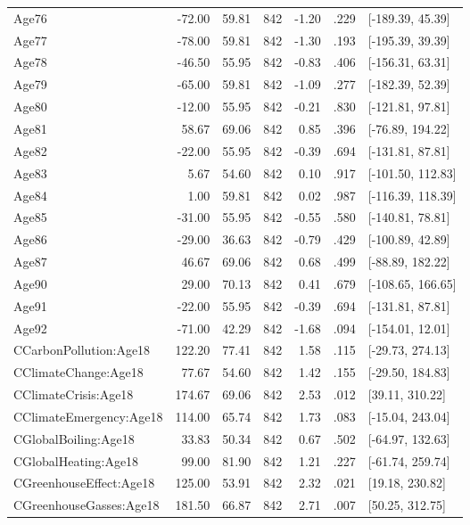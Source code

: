 \begin{table}[ht]
\begin{tabular}{lrrrrrl}
  Age76 & -72.00 & 59.81 & 842 & -1.20 & .229 & [-189.39, 45.39] \\ 
  Age77 & -78.00 & 59.81 & 842 & -1.30 & .193 & [-195.39, 39.39] \\ 
  Age78 & -46.50 & 55.95 & 842 & -0.83 & .406 & [-156.31, 63.31] \\ 
  Age79 & -65.00 & 59.81 & 842 & -1.09 & .277 & [-182.39, 52.39] \\ 
  Age80 & -12.00 & 55.95 & 842 & -0.21 & .830 & [-121.81, 97.81] \\ 
  Age81 & 58.67 & 69.06 & 842 & 0.85 & .396 & [-76.89, 194.22] \\ 
  Age82 & -22.00 & 55.95 & 842 & -0.39 & .694 & [-131.81, 87.81] \\ 
  Age83 & 5.67 & 54.60 & 842 & 0.10 & .917 & [-101.50, 112.83] \\ 
  Age84 & 1.00 & 59.81 & 842 & 0.02 & .987 & [-116.39, 118.39] \\ 
  Age85 & -31.00 & 55.95 & 842 & -0.55 & .580 & [-140.81, 78.81] \\ 
  Age86 & -29.00 & 36.63 & 842 & -0.79 & .429 & [-100.89, 42.89] \\ 
  Age87 & 46.67 & 69.06 & 842 & 0.68 & .499 & [-88.89, 182.22] \\ 
  Age90 & 29.00 & 70.13 & 842 & 0.41 & .679 & [-108.65, 166.65] \\ 
  Age91 & -22.00 & 55.95 & 842 & -0.39 & .694 & [-131.81, 87.81] \\ 
  Age92 & -71.00 & 42.29 & 842 & -1.68 & .094 & [-154.01, 12.01] \\ 
  CCarbonPollution:Age18 & 122.20 & 77.41 & 842 & 1.58 & .115 & [-29.73, 274.13] \\ 
  CClimateChange:Age18 & 77.67 & 54.60 & 842 & 1.42 & .155 & [-29.50, 184.83] \\ 
  CClimateCrisis:Age18 & 174.67 & 69.06 & 842 & 2.53 & .012 & [39.11, 310.22] \\ 
  CClimateEmergency:Age18 & 114.00 & 65.74 & 842 & 1.73 & .083 & [-15.04, 243.04] \\ 
  CGlobalBoiling:Age18 & 33.83 & 50.34 & 842 & 0.67 & .502 & [-64.97, 132.63] \\ 
  CGlobalHeating:Age18 & 99.00 & 81.90 & 842 & 1.21 & .227 & [-61.74, 259.74] \\ 
  CGreenhouseEffect:Age18 & 125.00 & 53.91 & 842 & 2.32 & .021 & [19.18, 230.82] \\ 
  CGreenhouseGasses:Age18 & 181.50 & 66.87 & 842 & 2.71 & .007 & [50.25, 312.75] \\ 

\end{tabular}
\end{table}
